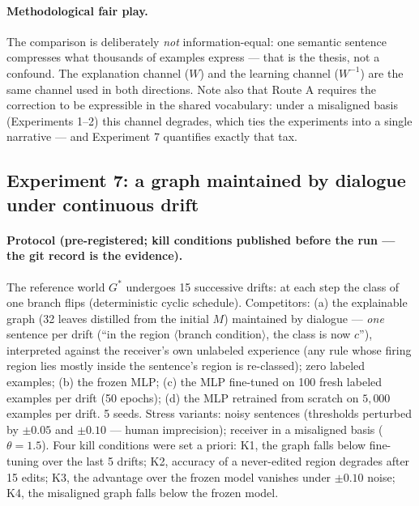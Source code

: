 \documentclass[10pt]{article}
\theoremstyle{definition}
\theoremstyle{plain}
\begin{document}
\paragraph{Methodological fair play.} The comparison is deliberately \emph{not} information-equal: one semantic sentence compresses what thousands of examples express --- that is the thesis, not a confound. The explanation channel ($W$) and the learning channel ($W^{-1}$) are the same channel used in both directions. Note also that Route A requires the correction to be expressible in the shared vocabulary: under a misaligned basis (Experiments 1--2) this channel degrades, which ties the experiments into a single narrative --- and Experiment 7 quantifies exactly that tax.

\subsection{Experiment 7: a graph maintained by dialogue under continuous drift}
\label{sec:exp7}

\paragraph{Protocol (pre-registered; kill conditions published before the run --- the git record is the evidence).} The reference world $G^\ast$ undergoes 15 successive drifts: at each step the class of one branch flips (deterministic cyclic schedule). Competitors: (a) the explainable graph (32 leaves distilled from the initial $M$) maintained by dialogue --- \emph{one} sentence per drift (``in the region $\langle$branch condition$\rangle$, the class is now $c$''), interpreted against the receiver's own unlabeled experience (any rule whose firing region lies mostly inside the sentence's region is re-classed); zero labeled examples; (b) the frozen MLP; (c) the MLP fine-tuned on 100 fresh labeled examples per drift (50 epochs); (d) the MLP retrained from scratch on $5{,}000$ examples per drift. 5 seeds. Stress variants: noisy sentences (thresholds perturbed by $\pm 0.05$ and $\pm 0.10$ --- human imprecision); receiver in a misaligned basis ($\theta = 1.5$). Four kill conditions were set a priori: K1, the graph falls below fine-tuning over the last 5 drifts; K2, accuracy of a never-edited region degrades after 15 edits; K3, the advantage over the frozen model vanishes under $\pm 0.10$ noise; K4, the misaligned graph falls below the frozen model.
\end{document}
